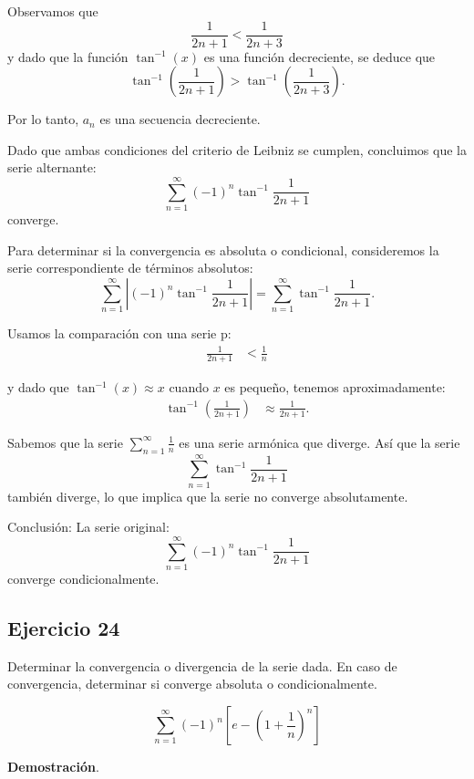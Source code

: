 \documentclass{article}
\begin{document}
    Observamos que
    $$
    \frac{1}{2n+1} < \frac{1}{2n+3}
    $$
    y dado que la función \( \tan^{-1}(x) \) es una función decreciente, se deduce que
    $$
    \tan^{-1}\left(\frac{1}{2n+1}\right) > \tan^{-1}\left(\frac{1}{2n+3}\right).
    $$

    Por lo tanto, \( a_{n} \) es una secuencia decreciente.

    Dado que ambas condiciones del criterio de Leibniz se cumplen, concluimos que la serie alternante:
    $$
    \sum_{n=1}^{\infty}(-1)^{n} \tan^{-1} \frac{1}{2n+1}
    $$
    converge.

    Para determinar si la convergencia es absoluta o condicional, consideremos la serie correspondiente de términos absolutos:
    $$
    \sum_{n=1}^{\infty} \left|(-1)^{n} \tan^{-1} \frac{1}{2n+1}\right| = \sum_{n=1}^{\infty} \tan^{-1} \frac{1}{2n+1}.
    $$

    Usamos la comparación con una serie p:
    \begin{align*}
    \frac{1}{2n+1} &< \frac{1}{n}
    \end{align*}

    y dado que \( \tan^{-1}(x) \approx x \) cuando \( x \) es pequeño, tenemos aproximadamente:
    \begin{align*}
    \tan^{-1} \left(\frac{1}{2n+1}\right) &\approx \frac{1}{2n+1}.
    \end{align*}

    Sabemos que la serie \( \sum_{n=1}^{\infty} \frac{1}{n} \) es una serie armónica que diverge. Así que la serie
    $$
    \sum_{n=1}^{\infty} \tan^{-1} \frac{1}{2n+1}
    $$
    también diverge, lo que implica que la serie no converge absolutamente.

    Conclusión: La serie original:
    $$
    \sum_{n=1}^{\infty}(-1)^{n} \tan^{-1} \frac{1}{2n+1}
    $$
    converge condicionalmente.

    \subsection*{Ejercicio 24}

    Determinar la convergencia o divergencia de la serie dada. En caso de convergencia, determinar si converge absoluta o condicionalmente.

    $$
    \sum_{n=1}^{\infty}(-1)^{n}\left[e-\left(1+\frac{1}{n}\right)^{n}\right]
    $$

    \textbf{Demostración}.\\
\end{document}
